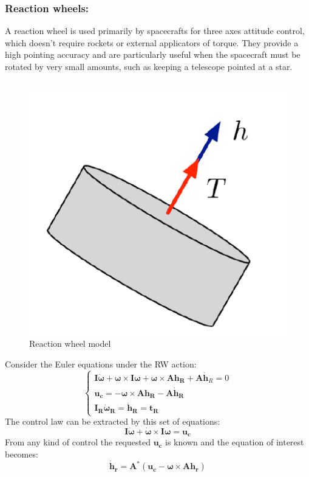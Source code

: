 \documentclass[11pt]{article}
\begin{document}
\subsubsection{Reaction wheels:}
A reaction wheel  is used primarily by spacecrafts for three axes attitude control, which doesn't require rockets or external applicators of torque. They provide a high pointing accuracy and are particularly useful when the spacecraft must be rotated by very small amounts, such as keeping a telescope pointed at a star.\\\\
\begin{minipage}{.5\textwidth}
\begin{figure} [H]
\centering 
\includegraphics[scale=0.7]{RW1.PNG}
\caption{ Reaction wheel model
\cite{RW1}}
\end{figure}
\end{minipage}
\begin{minipage}{.5\textwidth}
Consider the Euler equations under the RW action:
\begin{equation}
\begin{cases}
\mathbf{I}\boldsymbol{\dot{\omega}}+\boldsymbol{{\omega}}\times\mathbf{I}\boldsymbol{\omega}+\boldsymbol{\omega}\times\mathbf{A}\mathbf{h_R}+\mathbf{A}\mathbf{\dot{h}}_R=0\\
\mathbf{u_c}=-\boldsymbol{\omega}\times\mathbf{Ah_R}-\mathbf{A\mathbf{\dot{h}}_R}\\
\boldsymbol{I_R\dot{\omega}_R}=\mathbf{\dot{h}_R}=\mathbf{t_R}
\end{cases}
\end{equation}
The control law can be extracted by this set of equations:
\begin{equation}
\mathbf{I}\boldsymbol{\dot{\omega}}+\boldsymbol{\dot{\omega}}\times\mathbf{I}\boldsymbol{\omega}=\mathbf{u_c}
\end{equation}
From any kind of control the requested $\mathbf{u_c}$ is known and the equation of interest becomes:
\begin{equation}
 \mathbf{\dot{h}_r}=\mathbf{A^*}(\mathbf{u_{c}}-\boldsymbol{\omega}\times \mathbf{A}\mathbf{h_r})
\end{equation}
\end{minipage}\\\\
\end{document}
